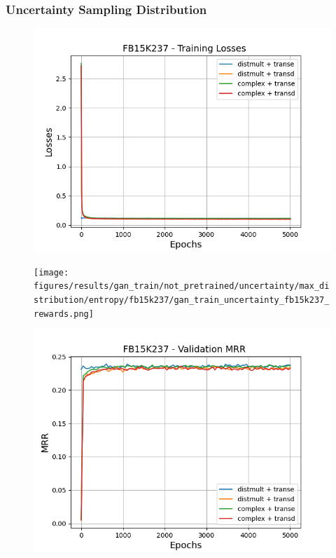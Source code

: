 \subsubsection{Uncertainty Sampling Distribution}

\begin{figure}
    \centering
    \begin{minipage}{.5\textwidth}
      \centering
      \includegraphics[width=0.9\linewidth]{figures/results/gan_train/not_pretrained/uncertainty/max_distribution/entropy/fb15k237/gan_train_uncertainty_fb15k237_losses.png}
    \end{minipage}%
    \begin{minipage}{.5\textwidth}
      \centering
      \texttt{[image: figures/results/gan\_train/not\_pretrained/uncertainty/max\_distribution/entropy/fb15k237/gan\_train\_uncertainty\_fb15k237\_rewards.png]}
    \end{minipage}
    \begin{minipage}{.5\textwidth}
      \centering
      \includegraphics[width=0.9\linewidth]{figures/results/gan_train/not_pretrained/uncertainty/max_distribution/entropy/fb15k237/gan_train_uncertainty_fb15k237_mrrs.png}

\end{minipage}
\end{figure}
